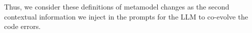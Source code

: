 \begin{comment}
    \item \emph{1)} Delete property\footnote{Property refers to Attribute, Reference, and Method.} \emph{p} in a class \texttt{C}. 
    
    \item \emph{2)} Delete class \texttt{C}. 
    
    \item \emph{3)} Rename element \emph{e} in a class \texttt{C}. 
    
    \item \emph{4)} Generalize property \emph{p} multiplicity from a single value to multiple values in a class \texttt{C}. 
    
    \item \emph{5)} Move property \emph{p} from class \texttt{Source} to \texttt{Target} through a reference \emph{ref}. 
    
    \item \emph{6)} Extract class of properties $p_{1},...,p_{n}$ from \texttt{Source} to \texttt{Target} through a reference \emph{ref}. 
    
    \item \emph{7)} Push property \emph{p} from super class \texttt{Super} to sub classes \texttt{Sub$_{1}$},...,\texttt{Sub$_{n}$}. 
    
    \item \emph{8)} Inline class \texttt{Source} to \texttt{Target} with properties $p_{1},...,p_{n}$. 
    
    \item \emph{9)} Change property \emph{p} type from \texttt{S} to \texttt{T} in a class \texttt{C}. 
\end{comment}

Thus, we consider these definitions of metamodel changes as the second contextual information we inject in the prompts for the LLM to co-evolve the code errors. 



